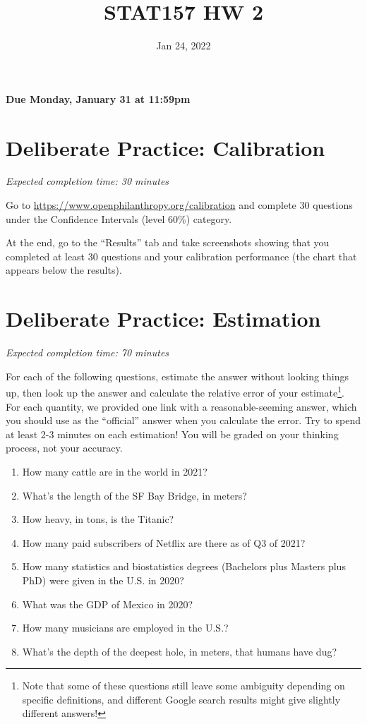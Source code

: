 \documentclass[11pt]{article}
\title{STAT157 HW 2}
\date{Jan 24, 2022}
\begin{document}
\maketitle

\hfill \textbf{Due Monday, January 31 at 11:59pm}

\section*{Deliberate Practice: Calibration}

\emph{Expected completion time: 30 minutes}

Go to \url{https://www.openphilanthropy.org/calibration} and complete 30 questions under the Confidence Intervals (level 60\%) category.

At the end, go to the ``Results'' tab and take screenshots showing that 
you completed at least 30 questions and your calibration 
performance (the chart that appears below the results).

\section*{Deliberate Practice: Estimation}

\emph{Expected completion time: 70 minutes}


For each of the following questions, estimate the answer without looking things up, then look up the answer and calculate the relative error of your estimate\footnote{Note that some of these questions still leave some ambiguity depending on specific definitions, and different Google search results might give slightly different answers!}. For each quantity, we provided one link with a reasonable-seeming answer, which you should use as the ``official'' answer when you calculate the error. Try to spend at least 2-3 minutes on each estimation! You will be graded on your thinking process, not your accuracy.

\begin{enumerate}
	\item How many cattle are in the world in 2021? 
	\item What's the length of the SF Bay Bridge, in meters? 
	\item How heavy, in tons, is the Titanic? 
	\item How many paid subscribers of Netflix are there as of Q3 of 2021?
	\item How many statistics and biostatistics degrees (Bachelors plus Masters plus PhD) were given in the U.S. in 2020? 
	\item What was the GDP of Mexico in 2020? 
	\item How many musicians are employed in the U.S.?
	\item What's the depth of the deepest hole, in meters, that humans have dug? 
\end{enumerate}
\end{document}
